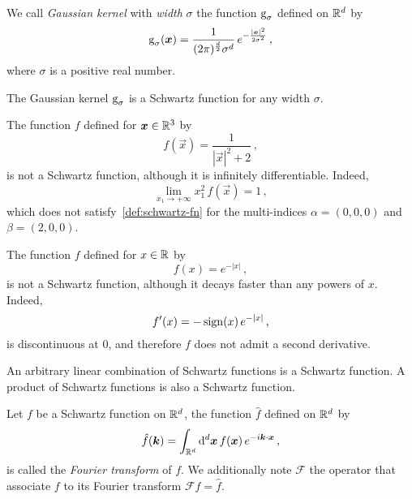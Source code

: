 \begin{definition}
  We call \emph{Gaussian kernel} with \emph{width} $\sigma$ the function $\operatorname{g}_{\sigma}$
  defined on $\mathbb{R}^d$ by
  \begin{equation}
    \operatorname{g}_{\sigma}(\bm{x})=\frac{1}{(2\pi)^{\frac{d}{2}}\sigma^d}\,e^{-\frac{|\bm{x}|^2}{2\sigma^2}}\,,
  \end{equation}
  where $\sigma$ is a positive real number.
\end{definition}
\begin{proposition}
  The Gaussian kernel $\operatorname{g}_{\sigma}$ is a Schwartz function for any width $\sigma$.
\end{proposition}
\begin{example}
  The function $f$ defined for $\bm{x}\in\mathbb{R}^3$ by
  \begin{equation}
    f(\vec{x})=\frac{1}{|\vec{x}|^2+2}\,,
  \end{equation}
  is not a Schwartz function, although it is infinitely differentiable. Indeed,
  \begin{equation}
    \lim_{x_1\to+\infty} x_1^2\,f(\vec{x})=1\,,
  \end{equation}
  which does not satisfy~\cref{def:schwartz-fn} for the multi-indices $\alpha=(0,0,0)$ and
  $\beta=(2,0,0)$.
\end{example}
\begin{example}
  The function $f$ defined for $x\in\mathbb{R}$ by
  \begin{equation}
    f(x)=e^{-|x|}\,,
  \end{equation}
  is not a Schwartz function, although it decays faster than any powers of $x$. Indeed,
  \begin{equation}
    f'(x)=-\operatorname{sign}(x)\,e^{-|x|}\,,
  \end{equation}
  is discontinuous at $0$, and therefore $f$ does not admit a second derivative.
\end{example}
\begin{proposition}
  An arbitrary linear combination of Schwartz functions is a Schwartz function. A product
  of Schwartz functions is also a Schwartz function.
\end{proposition}
\begin{definition}
  Let $f$ be a Schwartz function on $\mathbb{R}^d$, the function $\hat{f}$ defined on $\mathbb{R}^d$ by
  \begin{equation}
    \hat{f}(\bm{k})=\int_{\mathbb{R}^d}\mathrm{d}^d\bm{x}\,f(\bm{x})\,e^{-i\bm{k}\cdotp\bm{x}}\,,
  \end{equation}
  is called the \emph{Fourier transform} of $f$. We additionally note $\mathcal{F}$ the operator
  that associate $f$ to its Fourier transform $\mathcal{F}f=\hat{f}$.
\end{definition}
